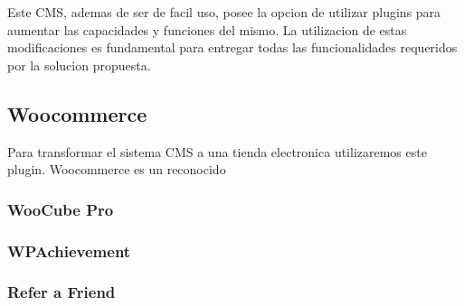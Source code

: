Este CMS, ademas de ser de facil uso, posee la opcion de utilizar plugins para aumentar las capacidades y
funciones del mismo. La utilizacion de estas modificaciones es fundamental para entregar todas las
funcionalidades requeridos por la solucion propuesta.
 
\subsection{Woocommerce}

Para transformar el sistema CMS a una tienda electronica utilizaremos este plugin. Woocommerce es un
reconocido 
\subsubsection{WooCube Pro}
\subsubsection{WPAchievement}
\subsubsection{Refer a Friend}

